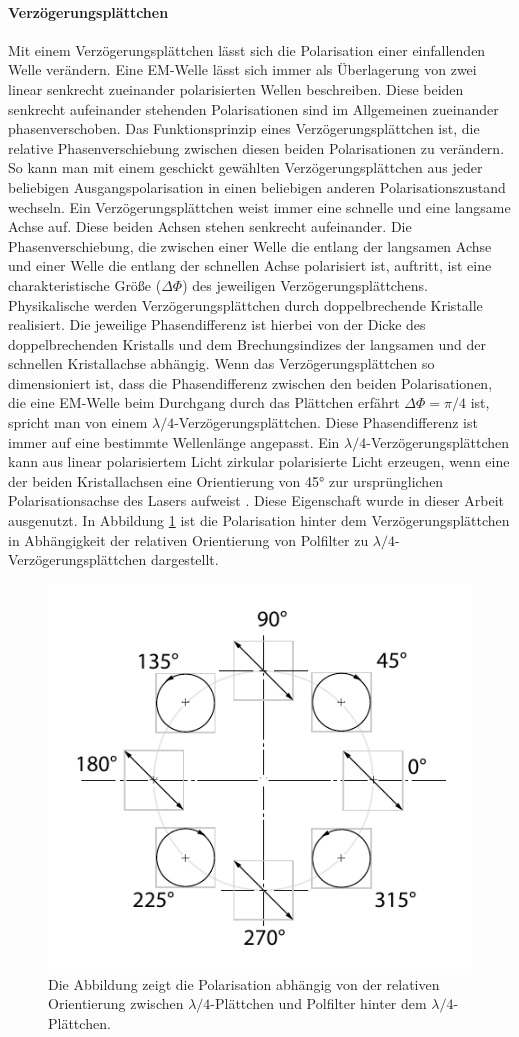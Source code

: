 \documentclass[titlepage]{article}
\begin{document}
	\paragraph{Verzögerungsplättchen}
	Mit einem Verzögerungsplättchen lässt sich die Polarisation einer einfallenden Welle verändern. Eine EM-Welle lässt sich immer als Überlagerung von zwei linear senkrecht zueinander polarisierten Wellen beschreiben. Diese beiden senkrecht aufeinander stehenden Polarisationen sind im Allgemeinen zueinander phasenverschoben. Das Funktionsprinzip eines Verzögerungsplättchen ist, die relative Phasenverschiebung zwischen diesen beiden Polarisationen zu verändern. So kann man mit einem geschickt gewählten Verzögerungsplättchen aus jeder beliebigen Ausgangspolarisation in einen beliebigen anderen Polarisationszustand wechseln. Ein Verzögerungsplättchen weist immer eine schnelle und eine langsame Achse auf. Diese beiden Achsen stehen senkrecht aufeinander. Die Phasenverschiebung, die zwischen einer Welle die entlang der langsamen Achse und einer Welle die entlang der schnellen Achse polarisiert ist, auftritt, ist eine charakteristische Größe ($\Delta\Phi$) des jeweiligen Verzögerungsplättchens. Physikalische werden Verzögerungsplättchen durch doppelbrechende Kristalle realisiert. Die jeweilige Phasendifferenz ist hierbei von der Dicke des doppelbrechenden Kristalls und dem Brechungsindizes der langsamen und der schnellen Kristallachse abhängig. Wenn das Verzögerungsplättchen so dimensioniert ist, dass die Phasendifferenz zwischen den beiden Polarisationen, die eine EM-Welle beim Durchgang durch das Plättchen erfährt $\Delta \Phi = \pi /4 $ ist, spricht man von einem  $\lambda /4$-Verzögerungsplättchen. Diese Phasendifferenz ist immer auf eine bestimmte Wellenlänge angepasst.  Ein $\lambda /4$-Verzögerungsplättchen kann aus linear polarisiertem Licht zirkular polarisierte Licht erzeugen, wenn eine der beiden Kristallachsen eine Orientierung von 45° zur ursprünglichen Polarisationsachse des Lasers aufweist \cite{Hecht.2018}. Diese Eigenschaft wurde in dieser Arbeit ausgenutzt. In Abbildung \ref{fig:polarisationlambda} ist die Polarisation hinter dem Verzögerungsplättchen in Abhängigkeit der relativen Orientierung von Polfilter zu $\lambda /4$-Verzögerungsplättchen dargestellt. 
	\begin{figure}
		\centering
		\includegraphics[width=0.5\linewidth]{figures/Polarisation_lambda}
		\caption{Die Abbildung zeigt die Polarisation abhängig von der relativen Orientierung zwischen $\lambda/4$-Plättchen und Polfilter hinter dem $\lambda/4$-Plättchen.}
		\label{fig:polarisationlambda}
	\end{figure}
	
\end{document}
